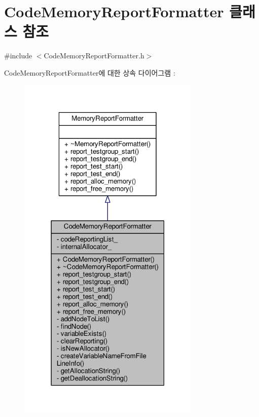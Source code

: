 \hypertarget{class_code_memory_report_formatter}{}\section{Code\+Memory\+Report\+Formatter 클래스 참조}
\label{class_code_memory_report_formatter}


{\ttfamily \#include $<$Code\+Memory\+Report\+Formatter.\+h$>$}



Code\+Memory\+Report\+Formatter에 대한 상속 다이어그램 \+: 
\nopagebreak
\begin{figure}[H]
\begin{center}
\leavevmode
\includegraphics[width=247pt]{class_code_memory_report_formatter__inherit__graph}
\end{center}
\end{figure}


